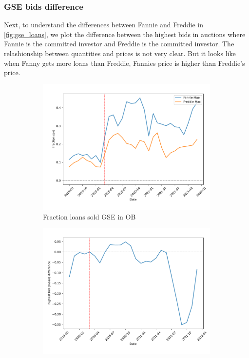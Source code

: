 \documentclass[11pt,a4paper]{article}
\begin{document}
\pagebreak
\subsubsection{GSE bids difference}

Next, to understand the differences between Fannie and Freddie in \ref{fig:gse_loans}, we plot the difference between the highest bids in auctions where Fannie is the committed investor and Freddie is the committed investor. The relashionship between quantities and prices is not very clear. But it looks like when Fanny gets more loans than Freddie, Fannies price is higher than Freddie's price.

\begin{figure}[h]
  \centering
  \begin{subfigure}[b]{0.49\textwidth}
      \includegraphics[width=0.998\textwidth]{../results/figures/sold_FreddieBid_mean_mat30_loan1_timeseries_nrmonthly_2.5_4_c25.0.pdf}
      \caption{Fraction loans sold GSE in OB } %
     \end{subfigure}
     \begin{subfigure}[b]{0.49\textwidth}
      \includegraphics[width=0.998\textwidth]{../results/figures/price_diff_ma_mat30_loan1_timeseries_nrmonthly_2.5_4_diffFF_ma5_c25.pdf}

\end{subfigure}
\end{figure}
\end{document}
